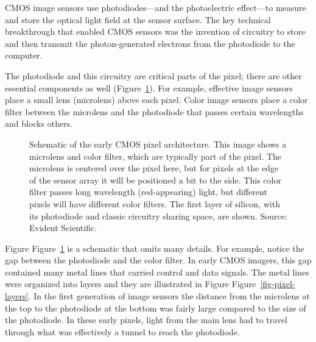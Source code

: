 \documentclass[
  letterpaper,
]{book}
\begin{document}
CMOS image sensors use photodiodes---and the photoelectric effect---to
measure and store the optical light field at the sensor surface. The key
technical breakthrough that enabled CMOS sensors was the invention of
circuitry to store and then transmit the photon-generated electrons from
the photodiode to the computer.

The photodiode and this circuitry are critical parts of the pixel; there
are other essential components as well
(Figure~\ref{fig-pixel-overview}). For example, effective image sensors
place a small lens (microlens) above each pixel. Color image sensors
place a color filter between the microlens and the photodiode that
passes certain wavelengths and blocks others.

\begin{figure}


\caption{\label{fig-pixel-overview}Schematic of the early CMOS pixel
architecture. This image shows a microlens and color filter, which are
typically part of the pixel. The microlens is centered over the pixel
here, but for pixels at the edge of the sensor array it will be
positioned a bit to the side. This color filter passes long wavelength
(red-appearing) light, but different pixels will have different color
filters. The first layer of silicon, with its photodiode and classic
circuitry sharing space, are shown. Source: Evident Scientific.}

\end{figure}%

Figure Figure~\ref{fig-pixel-overview} is a schematic that omits many
details. For example, notice the gap between the photodiode and the
color filter. In early CMOS imagers, this gap contained many metal lines
that carried control and data signals. The metal lines were organized
into layers and they are illustrated in Figure
Figure~\ref{fig-pixel-layers}. In the first generation of image sensors
the distance from the microlens at the top to the photodiode at the
bottom was fairly large compared to the size of the photodiode. In these
early pixels, light from the main lens had to travel through what was
effectively a tunnel to reach the photodiode.
\end{document}
